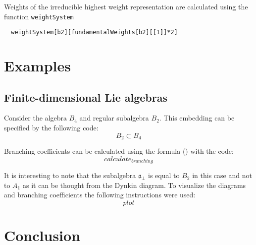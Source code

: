 \documentclass[12pt]{article}
\theoremstyle{definition}
\newcommand{\afb}{\mathfrak{a}_{\bot}}
\begin{document}
Weights of the irreducible highest weight representation are calculated using the function \lstinline{weightSystem}
\begin{lstlisting}
  weightSystem[b2][fundamentalWeights[b2][[1]]*2]
\end{lstlisting}


\section{Examples}
\label{sec:examples}

\subsection{Finite-dimensional Lie algebras}
\label{sec:finite-dimens-lie}

Consider the algebra $B_{4}$ and regular subalgebra $B_{2}$. This embedding can be specified by the following code:
\begin{equation}
  \label{eq:1}
  B_{2}\subset B_{4}
\end{equation}

Branching coefficients can be calculated using the formula () with the code:
\begin{equation}
  \label{eq:2}
  calculate_{branching}
\end{equation}

It is interesting to note that the subalgebra $\afb$ is equal to $B_{2}$ in this case and not to $A_{1}$ as it can be thought from the Dynkin diagram. To visualize the diagrams and branching coefficients the following instructions were used:
\begin{equation}
  \label{eq:3}
  plot
\end{equation}
\section{Conclusion}
\label{sec:conclusion}



{}

\end{document}
